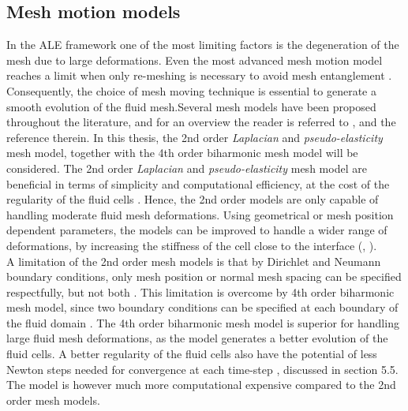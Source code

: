 \subsection{Mesh motion models}
In the ALE framework one of the most limiting factors is the degeneration of the mesh due to large deformations. Even the most advanced mesh motion model  reaches a limit when only re-meshing is necessary to avoid mesh entanglement \cite{Wall12006}. Consequently, the choice of  mesh moving technique is essential to generate a smooth evolution of the fluid mesh.Several mesh models have been proposed throughout the literature, and for an overview the reader is referred to \cite{MM2016}, and the reference therein. 
In this thesis, the 2nd order \textit{Laplacian} and \textit{pseudo-elasticity} mesh model, together with the 4th order biharmonic mesh model will be considered.  The 2nd order \textit{Laplacian} and \textit{pseudo-elasticity} mesh model are beneficial in terms of simplicity and computational efficiency, at the cost of the  regularity of the fluid cells  \cite{Wick2011}. Hence, the 2nd order models are only capable of handling moderate fluid mesh deformations. Using geometrical or mesh position dependent parameters, the models can be improved to handle a wider range of deformations, by increasing the stiffness of the cell close to the interface (\cite{Hsu}, \cite{Dwight}). \\
A limitation of the 2nd order mesh models is that by Dirichlet and Neumann boundary conditions, only mesh position or normal mesh spacing can be specified respectfully, but not both  \cite{Helenbrook2003}. This limitation is overcome by 4th order biharmonic mesh model, since two boundary conditions can be specified at each boundary of the fluid domain \cite{Helenbrook2003}. The 4th order biharmonic mesh model is superior for  handling large  fluid mesh deformations, as the model generates a better evolution of the fluid cells. A better regularity of the fluid cells also have the potential of less Newton steps needed for convergence at each time-step \cite{Wick2011}, discussed in section 5.5. The model is however much more computational expensive compared to the 2nd order mesh models. 
